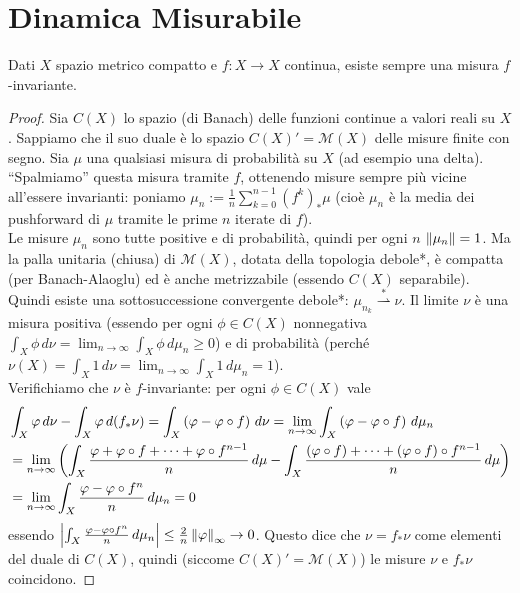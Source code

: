 \section{Dinamica Misurabile}

\begin{teo} Dati $X$ spazio metrico compatto e $f:X\to X$ continua, esiste sempre una misura $f$-invariante.
\end{teo}

\begin{proof}Sia $C(X)$ lo spazio (di Banach) delle funzioni continue a valori reali su $X$. Sappiamo che il suo duale è lo spazio $C(X)'=\mathcal{M}(X)$ delle misure finite con segno.
Sia $\mu$ una qualsiasi misura di probabilità su $X$ (ad esempio una delta). ``Spalmiamo'' questa misura tramite $f$, ottenendo misure sempre più vicine all'essere invarianti:
poniamo $\mu_n:=\frac{1}{n}\sum_{k=0}^{n-1}(f^k)_*\mu$ (cioè $\mu_n$ è la media dei pushforward di $\mu$ tramite le prime $n$ iterate di $f$). \\
Le misure $\mu_n$ sono tutte positive e di probabilità, quindi per ogni $n$ $\left\|\mu_n\right\|=1$. Ma la palla unitaria (chiusa) di $\mathcal{M}(X)$, dotata
della topologia debole*, è compatta (per Banach-Alaoglu) ed è anche metrizzabile (essendo $C(X)$ separabile). Quindi esiste una sottosuccessione convergente
debole*: $\mu_{n_k}\overset{*}{\rightharpoonup}\nu$. Il limite $\nu$ è una misura positiva (essendo per ogni $\phi\in C(X)$ nonnegativa $\int_X \phi\,d\nu=
\lim_{n\to\infty}\int_X\phi\,d\mu_n\ge 0$) e di probabilità (perché $\nu(X)=\int_X 1\,d\nu=\lim_{n\to\infty}\int_X 1\,d\mu_n=1$). \\
Verifichiamo che $\nu$ è $f$-invariante: per ogni $\phi\in C(X)$ vale
\[ \begin{split}&\int_X \varphi\,d\nu-\int_X \varphi\,d(f_*\nu)=\int_X \left(\varphi-\varphi\circ f\right)\,d\nu=\lim_{n\to\infty}\int_X \left(\varphi-\varphi\circ f\right)\,d\mu_n \\
&=\lim_{n\to\infty}\left(\int_X \frac{\varphi+\varphi\circ f+\dots+\varphi\circ f^{n-1}}{n}\,d\mu-\int_X \frac{(\varphi\circ f)+\dots+(\varphi\circ f)\circ f^{n-1}}{n}\,d\mu\right) \\
&=\lim_{n\to\infty}\int_X\frac{\varphi-\varphi\circ f^n}{n}\,d\mu_n=0 \end{split} \]
essendo $\left|\int_X\frac{\varphi-\varphi\circ f^n}{n}\,d\mu_n\right|\le\frac{2}{n}\left\|\varphi\right\|_\infty\to 0$. Questo dice che $\nu=f_*\nu$ come elementi del duale di $C(X)$,
quindi (siccome $C(X)'=\mathcal{M}(X)$) le misure $\nu$ e $f_*\nu$ coincidono.
\end{proof}

